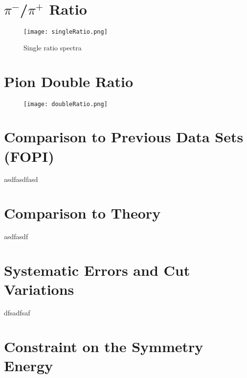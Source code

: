 \section{$\pi^-$/$\pi^+$ Ratio}

\begin{figure}
\centering
\texttt{[image: singleRatio.png]}
\caption{Single ratio spectra}
\label{fig:SRspectra}
\end{figure}


\section{Pion Double Ratio}

\begin{figure}[!htb]
\centering
\texttt{[image: doubleRatio.png]}
\caption{}
\label{fig:spectraDR}
\end{figure}




\section{Comparison to Previous Data Sets (FOPI)}
asdfasdfasd
\section{Comparison to Theory}
asdfasdf

\section{Systematic Errors and Cut Variations}
\label{sec:cutvar}
dfsadfsaf
\section{Constraint on the Symmetry Energy}
